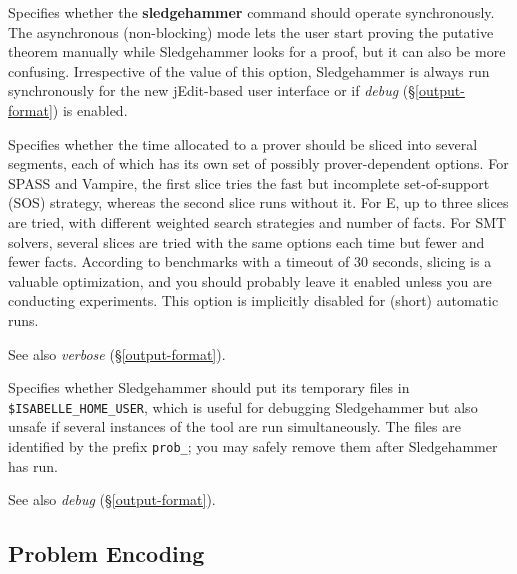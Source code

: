 \documentclass[a4paper,12pt]{article}
\begin{document}
\begin{enum}

Specifies whether the \textbf{sledgehammer} command should operate
synchronously. The asynchronous (non-blocking) mode lets the user start proving
the putative theorem manually while Sledgehammer looks for a proof, but it can
also be more confusing. Irrespective of the value of this option, Sledgehammer
is always run synchronously for the new jEdit-based user interface or if
\textit{debug} (\S\ref{output-format}) is enabled.

Specifies whether the time allocated to a prover should be sliced into several
segments, each of which has its own set of possibly prover-dependent options.
For SPASS and Vampire, the first slice tries the fast but incomplete
set-of-support (SOS) strategy, whereas the second slice runs without it. For E,
up to three slices are tried, with different weighted search strategies and
number of facts. For SMT solvers, several slices are tried with the same options
each time but fewer and fewer facts. According to benchmarks with a timeout of
30 seconds, slicing is a valuable optimization, and you should probably leave it
enabled unless you are conducting experiments. This option is implicitly
disabled for (short) automatic runs.

\nopagebreak
{\small See also \textit{verbose} (\S\ref{output-format}).}

Specifies whether Sledgehammer should put its temporary files in
\texttt{\$ISA\-BELLE\_\allowbreak HOME\_\allowbreak USER}, which is useful for
debugging Sledgehammer but also unsafe if several instances of the tool are run
simultaneously. The files are identified by the prefix \texttt{prob\_}; you may
safely remove them after Sledgehammer has run.

\nopagebreak
{\small See also \textit{debug} (\S\ref{output-format}).}
\end{enum}

\subsection{Problem Encoding}
\label{problem-encoding}
\end{document}
